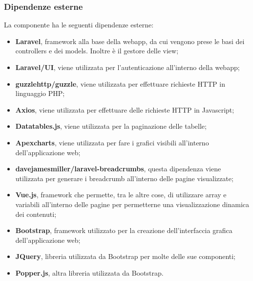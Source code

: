	\subsubsection{Dipendenze esterne}
		La componente ha le seguenti dipendenze esterne:
		\begin{itemize}
			\item \textbf{Laravel}, framework alla base della webapp, da cui vengono prese le basi dei controllers e dei models. Inoltre è il gestore delle view;
			\item \textbf{Laravel/UI}, viene utilizzata per l'autenticazione all'interno della webapp;
			\item \textbf{guzzlehttp/guzzle}, viene utilizzata per effettuare richieste HTTP in linguaggio PHP;
			\item \textbf{Axios}, viene utilizzata per effettuare delle richieste HTTP in Javascript;
			\item \textbf{Datatables.js}, viene utilizzata per la paginazione delle tabelle;
			\item \textbf{Apexcharts}, viene utilizzata per fare i grafici visibili all'interno dell'applicazione web;
			\item \textbf{davejamesmiller/laravel-breadcrumbs}, questa dipendenza viene utilizzata per generare i breadcrumb all'interno delle pagine visualizzate;
			\item \textbf{Vue.js}, framework che permette, tra le altre cose, di utilizzare array e variabili all'interno delle pagine per permetterne una visualizzazione dinamica dei contenuti;
			\item \textbf{Bootstrap}, framework utilizzato per la creazione dell'interfaccia grafica dell'applicazione web;
			\item \textbf{JQuery}, libreria utilizzata da Bootstrap per molte delle sue componenti;
			\item \textbf{Popper.js}, altra libreria utilizzata da Bootstrap.
		\end{itemize}



